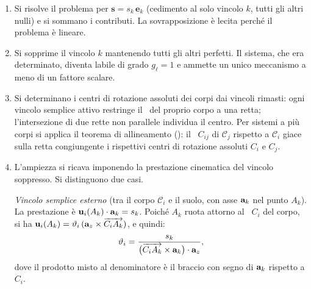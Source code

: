 \begin{enumerate}[label=(\arabic*), leftmargin=*,
	itemsep=4pt]
	
	\item Si risolve il problema per $\bm{s} = s_k\,\bm{e}_k$
	(cedimento al solo vincolo $k$, tutti gli altri nulli) e si
	sommano i contributi. La sovrapposizione è lecita perché il
	problema è lineare.
	
	\item Si sopprime il vincolo $k$ mantenendo tutti gli altri
	perfetti. Il sistema, che era determinato, diventa labile di
	grado $g_\ell = 1$ e ammette un unico meccanismo a meno di
	un fattore scalare.
	
	\item Si determinano i centri di rotazione assoluti dei corpi dai vincoli rimasti: ogni
	vincolo semplice attivo restringe il \CRa\ del proprio corpo a una
	retta; l'intersezione di due rette non parallele individua il
	centro. Per sistemi a più corpi si applica il teorema di
	allineamento (): il \CRr\
	$C_{ij}$ di $\mathcal{C}_j$ rispetto a $\mathcal{C}_i$ giace
	sulla retta congiungente i rispettivi centri di rotazione assoluti $C_i$ e $C_j$.
	
	\item L'ampiezza si ricava imponendo la prestazione cinematica del
	vincolo soppresso. Si distinguono due casi.
	
	\smallskip
	\noindent\textit{Vincolo semplice esterno} (tra il corpo
	$\mathcal{C}_i$ e il suolo, con asse $\mathbf{a}_k$ nel punto
	$A_k$). La prestazione è $\mathbf{u}_i(A_k)\cdot\mathbf{a}_k = s_k$.
	Poiché $A_k$ ruota attorno al \CRa\ $C_i$ del corpo, si ha
	$\mathbf{u}_i(A_k) = \vartheta_i\,(\mathbf{a}_z\times\overrightarrow{C_i
		A_k})$, e quindi:
	\begin{equation}\label{eq:ampiezza_esterno}
		\vartheta_i =
		\frac{s_k}
		{\bigl(\overrightarrow{C_i A_k}\times\mathbf{a}_k\bigr)
			\cdot\mathbf{a}_z},
	\end{equation}
	dove il prodotto misto al denominatore è il braccio con
	segno di $\mathbf{a}_k$ rispetto a $C_i$.
	

\end{enumerate}
